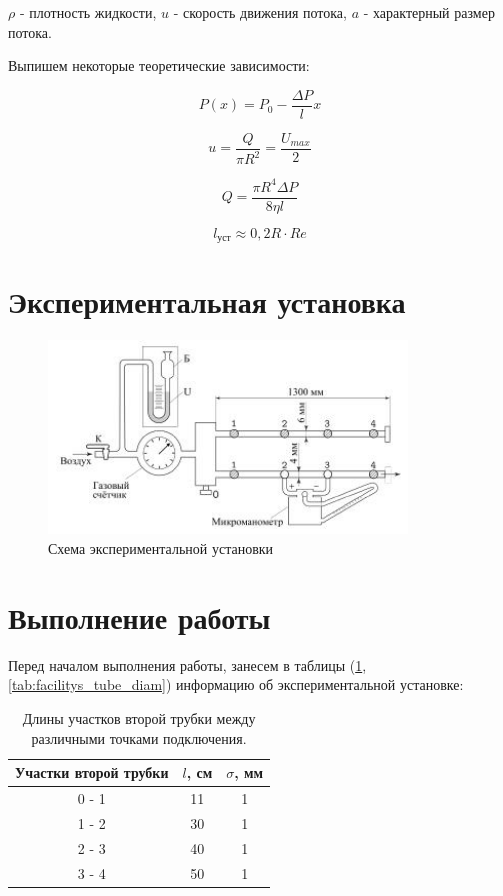 \documentclass[12pt,a4paper]{article}
\begin{document}
$\rho$ - плотность жидкости, $u$ - скорость движения потока, $a$ - характерный размер потока.

Выпишем некоторые теоретические зависимости:

$$P(x) = P_{0} - \frac{\Delta P}{l}x$$

$$u = \frac{Q}{\pi R^{2}} = \frac{U_{max}}{2}$$

$$Q = \frac{\pi R^{4} \Delta P}{8\eta l}$$

$$l_{\text{уст}} \approx 0,2R\cdot Re$$
\newpage

\section{Экспериментальная установка}

\begin{figure}[h!]
	\begin{center}
		\includegraphics[width = 0.85\textwidth]{Scem_of_facility.jpg}
		\caption{Схема экспериментальной установки}
		\label{fig:facility}
	\end{center}
\end{figure}

\section{Выполнение работы}

Перед началом выполнения работы, занесем в таблицы (\ref{tab:second_tube_parametrs},\ref{tab:facilitys_tube_diam})  информацию об экспериментальной установке:

\begin{table}[h!]
\centering
\begin{tabular}{|c|c|c|}
\hline
Участки второй трубки & $l$, см & $\sigma$, мм \\ \hline
0 - 1                 & 11      & 1            \\ \hline
1 - 2                 & 30      & 1            \\ \hline
2 - 3                 & 40      & 1            \\ \hline
3 - 4                 & 50      & 1            \\ \hline
\end{tabular}
\caption{Длины участков второй трубки между различными точками подключения.}
\label{tab:second_tube_parametrs}
\end{table}
\end{document}
